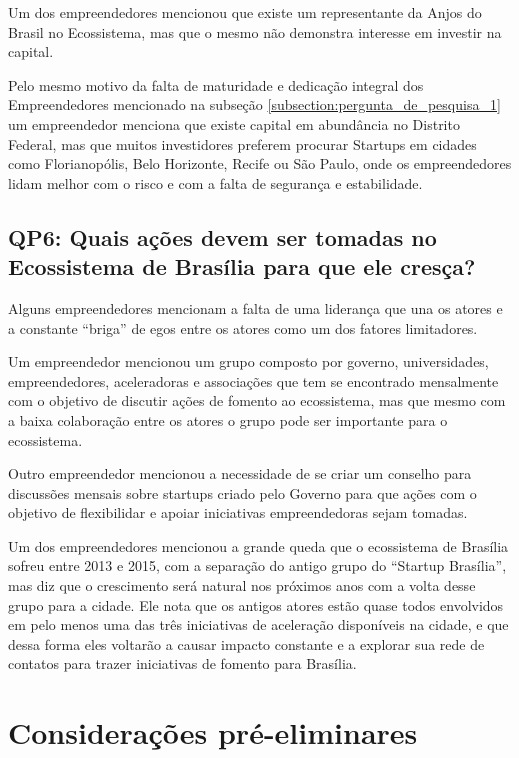 Um dos empreendedores mencionou que existe um representante da Anjos do Brasil no Ecossistema, mas que o mesmo não demonstra interesse em investir na capital.

Pelo mesmo motivo da falta de maturidade e dedicação integral dos Empreendedores mencionado na subseção \ref{subsection:pergunta_de_pesquisa_1} um empreendedor menciona que existe capital em abundância no Distrito Federal, mas que muitos investidores preferem procurar Startups em cidades como Florianopólis, Belo Horizonte, Recife ou São Paulo, onde os empreendedores lidam melhor com o risco e com a falta de segurança e estabilidade.

\subsection{QP6: Quais ações devem ser tomadas no Ecossistema de Brasília para que ele cresça?}
\label{subsection:pergunta_de_pesquisa_6}

Alguns empreendedores mencionam a falta de uma liderança que una os atores e a constante ``briga'' de egos entre os atores como um dos fatores limitadores.

Um empreendedor mencionou um grupo composto por governo, universidades, empreendedores, aceleradoras e associações que tem se encontrado mensalmente com o objetivo de discutir ações de fomento ao ecossistema, mas que mesmo com a baixa colaboração entre os atores o grupo pode ser importante para o ecossistema. 

Outro empreendedor mencionou a necessidade de se criar um conselho para discussões mensais sobre startups criado pelo Governo para que ações com o objetivo de flexibilidar e apoiar iniciativas empreendedoras sejam tomadas.

Um dos empreendedores mencionou a grande queda que o ecossistema de Brasília sofreu entre 2013 e 2015, com a separação do antigo grupo do ``Startup Brasília'', mas diz que o crescimento será natural nos próximos anos com a volta desse grupo para a cidade. Ele nota que os antigos atores estão quase todos envolvidos em pelo menos uma das três iniciativas de aceleração disponíveis na cidade, e que dessa forma eles voltarão a causar impacto constante e a explorar sua rede de contatos para trazer iniciativas de fomento para Brasília.

\section{Considerações pré-eliminares}
\label{consideracoes_pre_eliminares}

